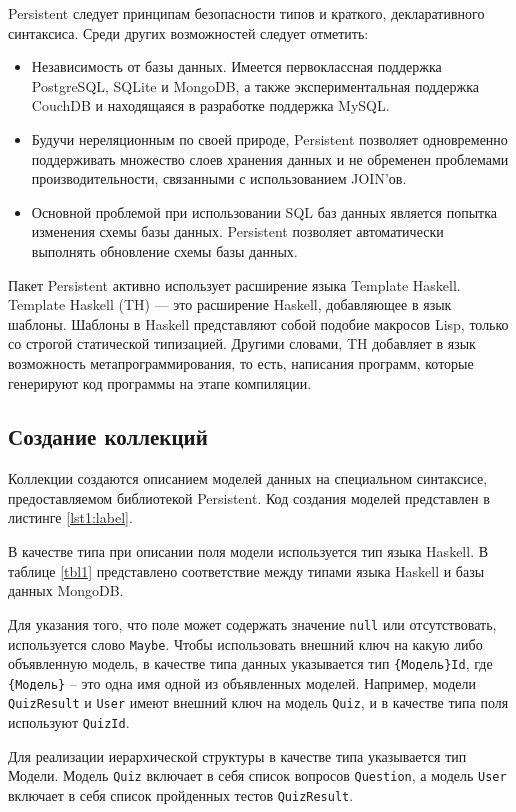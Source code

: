 Persistent следует принципам безопасности типов и краткого, декларативного синтаксиса. Среди других возможностей следует отметить:

\begin{itemize}
	\item Независимость от базы данных. Имеется первоклассная поддержка PostgreSQL, SQLite и MongoDB, а также экспериментальная поддержка CouchDB и находящаяся в разработке поддержка MySQL.
	\item Будучи нереляционным по своей природе, Persistent позволяет одновременно поддерживать множество слоев хранения данных и не обременен проблемами производительности, связанными с использованием JOIN’ов.
	\item Основной проблемой при использовании SQL баз данных является попытка изменения схемы базы данных. Persistent позволяет автоматически выполнять обновление схемы базы данных.
\end{itemize}

Пакет Persistent активно использует расширение языка Template Haskell. Template Haskell (TH) — это расширение Haskell, добавляющее в язык шаблоны. Шаблоны в Haskell представляют собой подобие макросов Lisp, только со строгой статической типизацией. Другими словами, TH добавляет в язык возможность метапрограммирования, то есть, написания программ, которые генерируют код программы на этапе компиляции. 

\subsection{Создание коллекций}
Коллекции создаются описанием моделей данных на специальном синтаксисе, предоставляемом библиотекой Persistent. Код создания моделей представлен в листинге \ref{lst1:label}.

В качестве типа при описании поля модели используется тип языка Haskell. В таблице \ref{tbl1} представлено соответствие между типами языка Haskell и базы данных MongoDB.

Для указания того, что поле может содержать значение \texttt{null} или отсутствовать, используется слово \texttt{Maybe}. Чтобы использовать внешний ключ на какую либо объявленную модель, в качестве типа данных указывается тип \texttt{\{Модель\}Id}, где \texttt{\{Модель\}} -- это одна имя одной из объявленных моделей. Например, модели \texttt{QuizResult} и \texttt{User} имеют внешний ключ на модель \texttt{Quiz}, и в качестве типа поля используют \texttt{QuizId}. 

Для реализации иерархической структуры в качестве типа указывается тип Модели. Модель \texttt{Quiz} включает в себя список вопросов \texttt{Question}, а модель \texttt{User} включает в себя список пройденных тестов \texttt{QuizResult}.

